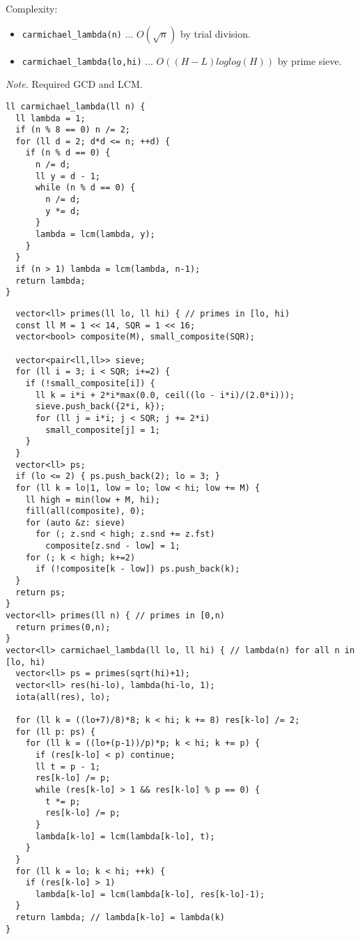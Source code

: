 Complexity:
\begin{itemize}
  \item \lstinline{carmichael_lambda(n)} ... $O(\sqrt{n})$ by trial division.
  \item \lstinline{carmichael_lambda(lo,hi)} ... $O((H-L) loglog(H))$ by prime sieve.
\end{itemize}

\textit{Note.} Required GCD and LCM.

\begin{lstlisting}
ll carmichael_lambda(ll n) {
  ll lambda = 1;
  if (n % 8 == 0) n /= 2;
  for (ll d = 2; d*d <= n; ++d) {
    if (n % d == 0) {
      n /= d;
      ll y = d - 1;
      while (n % d == 0) {
        n /= d;
        y *= d;
      }
      lambda = lcm(lambda, y);
    }
  }
  if (n > 1) lambda = lcm(lambda, n-1);
  return lambda;
}
\end{lstlisting}
\newpage
\begin{lstlisting}
  vector<ll> primes(ll lo, ll hi) { // primes in [lo, hi)
  const ll M = 1 << 14, SQR = 1 << 16;
  vector<bool> composite(M), small_composite(SQR);

  vector<pair<ll,ll>> sieve; 
  for (ll i = 3; i < SQR; i+=2) {
    if (!small_composite[i]) {
      ll k = i*i + 2*i*max(0.0, ceil((lo - i*i)/(2.0*i)));
      sieve.push_back({2*i, k});
      for (ll j = i*i; j < SQR; j += 2*i) 
        small_composite[j] = 1;
    }
  }
  vector<ll> ps; 
  if (lo <= 2) { ps.push_back(2); lo = 3; }
  for (ll k = lo|1, low = lo; low < hi; low += M) {
    ll high = min(low + M, hi);
    fill(all(composite), 0);
    for (auto &z: sieve) 
      for (; z.snd < high; z.snd += z.fst)
        composite[z.snd - low] = 1;
    for (; k < high; k+=2) 
      if (!composite[k - low]) ps.push_back(k);
  }
  return ps;
}
vector<ll> primes(ll n) { // primes in [0,n)
  return primes(0,n);
}
vector<ll> carmichael_lambda(ll lo, ll hi) { // lambda(n) for all n in [lo, hi)
  vector<ll> ps = primes(sqrt(hi)+1);
  vector<ll> res(hi-lo), lambda(hi-lo, 1);
  iota(all(res), lo);

  for (ll k = ((lo+7)/8)*8; k < hi; k += 8) res[k-lo] /= 2;
  for (ll p: ps) {
    for (ll k = ((lo+(p-1))/p)*p; k < hi; k += p) {
      if (res[k-lo] < p) continue;
      ll t = p - 1;
      res[k-lo] /= p;
      while (res[k-lo] > 1 && res[k-lo] % p == 0) {
        t *= p;
        res[k-lo] /= p; 
      }
      lambda[k-lo] = lcm(lambda[k-lo], t);
    }
  }
  for (ll k = lo; k < hi; ++k) {
    if (res[k-lo] > 1) 
      lambda[k-lo] = lcm(lambda[k-lo], res[k-lo]-1);
  }
  return lambda; // lambda[k-lo] = lambda(k)
}
\end{lstlisting}

